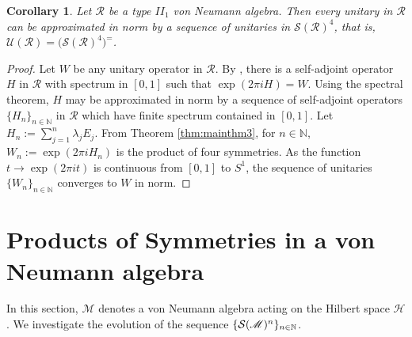 \documentclass[12pt, preprint]{amsart}
\newtheorem{cor}[thm]{Corollary}
\newcommand{\N}{\mathbb{N}}
\theoremstyle{definition}
\theoremstyle{remark}
\numberwithin{equation}{section}
\theoremstyle{ser}
\theoremstyle{serr}
\theoremstyle{ser}
\begin{document}
\begin{cor}
\textsl{
Let $\mathscr{R}$ be a type $II_1$ von Neumann algebra. Then every unitary in $\mathscr{R}$ can be approximated in norm by a sequence of unitaries in $\mathcal{S}(\mathscr{R})^4$, that is, $\mathcal{U}(\mathscr{R}) = \big( \mathcal{S}(\mathscr{R})^4 \big)^{=}$.
}
\end{cor}
\begin{proof}
Let $W$ be any unitary operator in $\mathscr{R}$. By \cite[Theorem 5.2.5]{kadison-ringrose1}, there is a self-adjoint operator $H$ in $\mathscr{R}$ with spectrum in $[0, 1]$ such that $\exp(2 \pi i H) = W$. Using the spectral theorem, $H$ may be approximated in norm by a sequence of self-adjoint operators $\{ H_n \}_{n \in \mathbb{N} }$ in $\mathscr{R}$ which have finite spectrum contained in $[0, 1]$. Let $H_n := \sum_{j=1}^n \lambda _j E_j$. From Theorem \ref{thm:mainthm3}, for $n \in \mathbb{N}$, $W_n := \exp(2 \pi i H_n)$ is the product of four symmetries. As the function $t \rightarrow \exp(2 \pi i t)$ is continuous from $[0, 1]$ to $S^1$, the sequence of unitaries $\{ W_n \}_{n \in \mathbb{N}}$ converges to $W$ in norm.  
\end{proof}





\section{Products of Symmetries in a von Neumann algebra}

In this section, $\mathscr{M}$ denotes a von Neumann algebra acting on the Hilbert space $\mathscr{H}$. We investigate the evolution of the sequence $\{ \sS (\mathscr{M})^n \}_{n \in \N}$.
\end{document}
